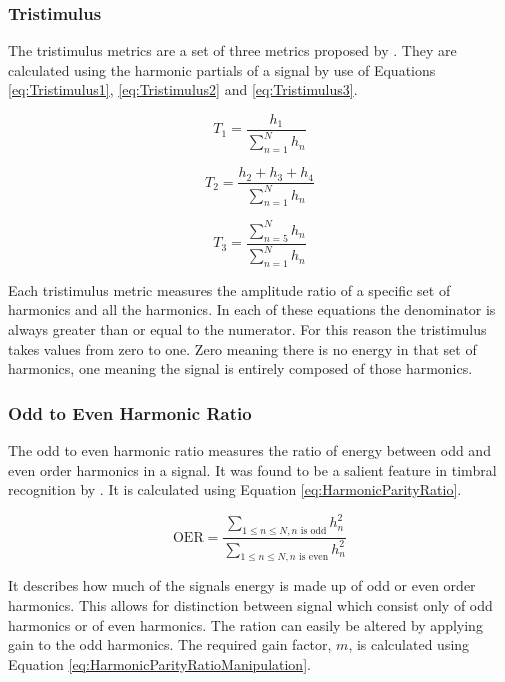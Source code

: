 		\subsubsection*{Tristimulus}
			The tristimulus metrics are a set of three metrics proposed by \citet{pollard1982a}. They are
			calculated using the harmonic partials of a signal by use of Equations \ref{eq:Tristimulus1},
			\ref{eq:Tristimulus2} and \ref{eq:Tristimulus3}.
			
			\begin{equation}
				T_{1} = \frac{h_{1}}{\sum_{n = 1}^{N} h_{n}}
				\label{eq:Tristimulus1}
			\end{equation}

			\begin{equation}
				T_{2} = \frac{h_{2} + h_{3} + h_{4}}{\sum_{n = 1}^{N} h_{n}}
				\label{eq:Tristimulus2}
			\end{equation}

			\begin{equation}
				T_{3} = \frac{\sum_{n = 5}^{N} h_{n}}{\sum_{n = 1}^{N} h_{n}}
				\label{eq:Tristimulus3}
			\end{equation}

			Each tristimulus metric measures the amplitude ratio of a specific set of harmonics and all the
			harmonics. In each of these equations the denominator is always greater than or equal to the
			numerator. For this reason the tristimulus takes values from zero to one. Zero meaning there is no
			energy in that set of harmonics, one meaning the signal is entirely composed of those harmonics.

		\subsubsection*{Odd to Even Harmonic Ratio}
			The odd to even harmonic ratio measures the ratio of energy between odd and even order harmonics in
			a signal. It was found to be a salient feature in timbral recognition by \citet{hall2010importance}.
			It is calculated using Equation \ref{eq:HarmonicParityRatio}.
			
			\begin{equation}
				\textrm{OER} = \frac{\sum_{1 \leq n \leq N, n \textrm{ is odd}} h_{n}^{2}}
					       {\sum_{1 \leq n \leq N, n \textrm{ is even}} h_{n}^{2}}
				\label{eq:HarmonicParityRatio}
			\end{equation}

			It describes how much of the signals energy is made up of odd or even order harmonics. This allows
			for distinction between signal which consist only of odd harmonics or of even harmonics. The ration
			can easily be altered by applying gain to the odd harmonics. The required gain factor, $m$, is
			calculated using Equation \ref{eq:HarmonicParityRatioManipulation}.

